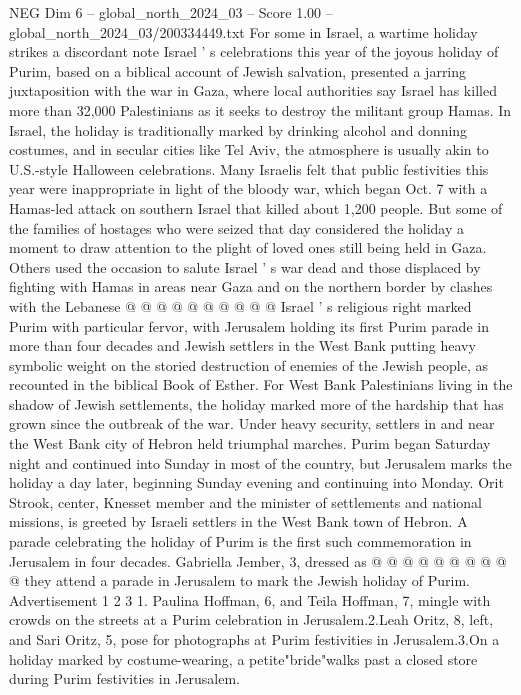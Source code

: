 \begin{textsample}{NEG Dim 6 – global\_north\_2024\_03 – Score 1.00 – global\_north\_2024\_03/200334449.txt}  \label{ex:f6_neg_405}
For some in Israel, a wartime holiday strikes a discordant note Israel ' s celebrations this year of the joyous holiday of Purim, based on a biblical account of Jewish salvation, presented a jarring juxtaposition with the war in Gaza, where local authorities say Israel has killed more than 32,000 Palestinians as it seeks to destroy the militant group Hamas.
In Israel, the holiday is traditionally marked by drinking alcohol and donning costumes, and in secular cities like Tel Aviv, the atmosphere is usually akin to U.S.-style Halloween celebrations.
Many Israelis felt that public festivities this year were inappropriate in light of the bloody war, which began Oct. 7 with a Hamas-led attack on southern Israel that killed about 1,200 people.
But some of the families of hostages who were seized that day considered the holiday a moment to draw attention to the plight of loved ones still being held in Gaza.
Others used the occasion to salute Israel ' s war dead and those displaced by fighting with Hamas in areas near Gaza and on the northern border by clashes with the Lebanese @ @ @ @ @ @ @ @ @ @ Israel ' s religious right marked Purim with particular fervor, with Jerusalem holding its first Purim parade in more than four decades and Jewish settlers in the West Bank putting heavy symbolic weight on the storied destruction of enemies of the Jewish people, as recounted in the biblical Book of Esther.
For West Bank Palestinians living in the shadow of Jewish settlements, the holiday marked more of the hardship that has grown since the outbreak of the war.
Under heavy security, settlers in and near the West Bank city of Hebron held triumphal marches.
Purim began Saturday night and continued into Sunday in most of the country, but Jerusalem marks the holiday a day later, beginning Sunday evening and continuing into Monday.
Orit Strook, center, Knesset member and the minister of settlements and national missions, is greeted by Israeli settlers in the West Bank town of Hebron.
A parade celebrating the holiday of Purim is the first such commemoration in Jerusalem in four decades.
Gabriella Jember, 3, dressed as @ @ @ @ @ @ @ @ @ @ they attend a parade in Jerusalem to mark the Jewish holiday of Purim.
Advertisement 1 2 3 1.
Paulina Hoffman, 6, and Teila Hoffman, 7, mingle with crowds on the streets at a Purim celebration in Jerusalem.2.Leah Oritz, 8, left, and Sari Oritz, 5, pose for photographs at Purim festivities in Jerusalem.3.On a holiday marked by costume-wearing, a petite"bride"walks past a closed store during Purim festivities in Jerusalem.

\end{textsample}
